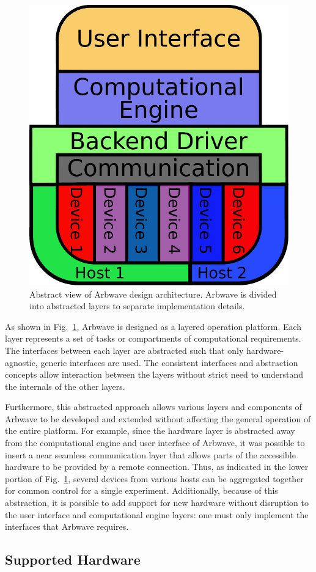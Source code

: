 \begin{figure}[ht!]
  \centerline{\includegraphics[width=.4\textwidth]{figures/design-layout}}
  \caption[Arbwave design architecture]{
    Abstract view of Arbwave design architecture.  Arbwave is divided into
    abstracted layers to separate implementation details.
  }
  \label{fig:intro:design}
\end{figure}

As shown in Fig.~\ref{fig:intro:design}, Arbwave is designed as a layered
operation platform.  Each layer represents a set of tasks or compartments of
computational requirements.  The interfaces between each layer are abstracted
such that only hardware-agnostic, generic interfaces are used.  The consistent
interfaces and abstraction concepts allow interaction between the layers without
strict need to understand the internals of the other layers.

Furthermore, this abstracted approach allows various layers and components of
Arbwave to be developed and extended without affecting the general operation of
the entire platform.  For example, since the hardware layer is abstracted away
from the computational engine and user interface of Arbwave, it was possible to
insert a near seamless communication layer that allows parts of the accessible
hardware to be provided by a remote connection.  Thus, as indicated in the lower
portion of Fig.~\ref{fig:intro:design}, several devices from various hosts can
be aggregated together for common control for a single experiment.
Additionally, because of this abstraction, it is possible to add support for new
hardware without disruption to the user interface and computational engine
layers: one must only implement the interfaces that Arbwave requires.


\subsection{Supported Hardware}\label{sec:hardware}

